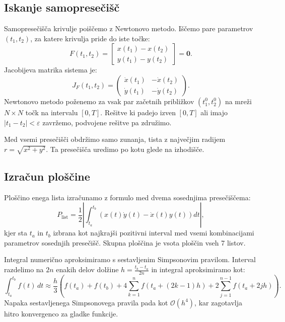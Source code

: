\documentclass[12pt]{article}
\begin{document}
\subsection*{Iskanje samopresečišč}
Samopresečišča krivulje poiščemo z Newtonovo metodo. Iščemo pare parametrov $(t_1, t_2)$, za katere krivulja pride do iste točke:
\begin{equation}
    F(t_1, t_2) = \begin{bmatrix} x(t_1) - x(t_2) \\ y(t_1) - y(t_2) \end{bmatrix} = \mathbf{0}.
\end{equation}
Jacobijeva matrika sistema je:
\begin{equation}
    J_F(t_1, t_2) = \begin{pmatrix} \dot{x}(t_1) & -\dot{x}(t_2) \\ \dot{y}(t_1) & -\dot{y}(t_2) \end{pmatrix}.
\end{equation}
Newtonovo metodo poženemo za vsak par začetnih približkov $(t_1^0, t_2^0)$ na mreži $N \times N$ točk na intervalu $[0, T]$. Rešitve ki padejo izven $[0, T]$  ali imajo $|t_1 - t_2| < \varepsilon$ zavržemo, podvojene rešitve pa združimo.

Med vsemi presečišči obdržimo samo zunanja, tista z največjim radijem $r = \sqrt{x^2 + y^2}$. Ta presečišča uredimo po kotu glede na izhodišče.

\subsection*{Izračun ploščine}
Ploščino enega lista izračunamo z formulo med dvema sosednjima presečiščema:
\begin{equation}
    P_{\text{list}} = \frac{1}{2}\left|\int_{t_a}^{t_b} 
    \left(x(t)\dot{y}(t) - \dot{x}(t)y(t)\right)dt\right|,
\end{equation}
kjer sta $t_a$ in $t_b$ izbrana kot najkrajši pozitivni interval med vsemi kombinacijami parametrov sosednjih presečišč. Skupna ploščina je vsota ploščin vseh 7 listov.

Integral numerično aproksimiramo s sestavljenim Simpsonovim pravilom. Interval razdelimo na $2n$ enakih delov dolžine $h = \frac{t_b - t_a}{2n}$ in integral aproksimiramo kot:
\begin{equation}
    \int_{t_a}^{t_b} f(t)\,dt \approx \frac{h}{3}\left(f(t_a) + f(t_b) + 
    4\sum_{k=1}^{n} f\left(t_a + (2k-1)h\right) + 
    2\sum_{j=1}^{n-1} f\left(t_a + 2jh\right)\right).
\end{equation}
Napaka sestavljenega Simpsonovega pravila pada kot $\mathcal{O}(h^4)$, kar zagotavlja hitro konvergenco za gladke funkcije.
\end{document}
